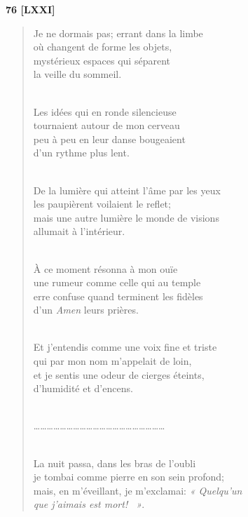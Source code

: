 \documentclass[a4paper,12pt]{book}
\begin{document}
\bigskip

\begin{center} {\bf 76 [LXXI]}  \end{center}

\begin{verse}
Je ne dormais pas; errant dans la limbe \\
où changent de forme les objets, \\
mystérieux espaces qui séparent \\
la veille du sommeil. \\ \

Les idées qui en ronde silencieuse \\
tournaient autour de mon cerveau \\
peu à peu en leur danse bougeaient \\
d'un rythme plus lent. \\ \

De la lumière qui atteint l'âme par les yeux \\
les paupièrent voilaient le reflet; \\
mais une autre lumière le monde de visions \\
allumait à l'intérieur. \\ \

À ce moment résonna à mon ouïe \\
une rumeur comme celle qui au temple \\
erre confuse quand terminent les fidèles \\
d'un {\em Amen\/} leurs prières. \\ \

Et j'entendis comme une voix fine et triste \\
qui par mon nom m'appelait de loin, \\
et je sentis une odeur de cierges éteints, \\
d'humidité et d'encens. \\ \

\ldots\ldots\ldots\ldots\ldots\ldots\ldots\ldots\ldots\ldots\ldots\ldots\ldots\ldots\ldots\ldots\ldots\ldots\ldots\ldots \\ \

La nuit passa, dans les bras de l'oubli \\
je tombai comme pierre en son sein profond; \\
mais, en m'éveillant, je m'exclamai: {\em « Quelqu'un \\
que j'aimais est mort! ~»}. \\
\end{verse}
\end{document}
